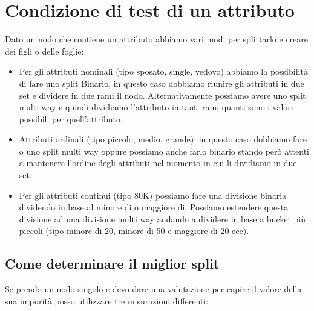\documentclass[14pt]{extreport}
\begin{document}
\section{Condizione di test di un attributo}

Dato un nodo che contiene un attributo abbiamo vari modi per splittarlo e creare dei figli o delle foglie:

\begin{itemize}
    \item Per gli attributi nominali (tipo sposato, single, vedovo) abbiamo la possibilità di fare uno split Binario, in questo caso dobbiamo riunire gli attributi in due set e dividere in due rami il nodo. Alternativamente possiamo avere uno split multi way e quindi dividiamo l'attributo in tanti rami quanti sono i valori possibili per quell'attributo.
    \item Attributi ordinali (tipo piccolo, medio, grande): in questo caso dobbiamo fare o uno split multi way oppure possiamo anche farlo binario stando però attenti a mantenere l'ordine degli attributi nel momento in cui li dividiamo in due set.
    \item Per gli attributi continui (tipo 80K) possiamo fare una divisione binaria dividendo in base al minore di o maggiore di. Possiamo estendere questa divisione ad una divisione multi way andando a dividere in base a bucket più piccoli (tipo minore di 20, minore di 50 e maggiore di 20 ecc).
\end{itemize}

\subsection{Come determinare il miglior split}

Se prendo un nodo singolo e devo dare una valutazione per capire il valore della sua impurità posso utilizzare tre misurazioni differenti:
\end{document}
